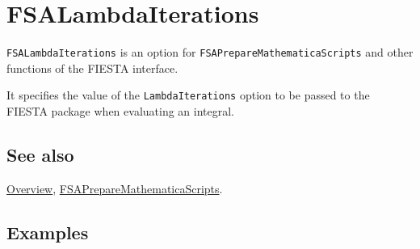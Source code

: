 \documentclass[../FeynHelpersManual.tex]{subfiles}
\begin{document}
\hypertarget{fsalambdaiterations}{
\section{FSALambdaIterations}\label{fsalambdaiterations}}

\texttt{FSALambdaIterations} is an option for
\texttt{FSAPrepareMathematicaScripts} and other functions of the FIESTA
interface.

It specifies the value of the \texttt{LambdaIterations} option to be
passed to the FIESTA package when evaluating an integral.

\subsection{See also}

\hyperlink{toc}{Overview},
\hyperlink{fsapreparemathematicascripts}{FSAPrepareMathematicaScripts}.

\subsection{Examples}
\end{document}
